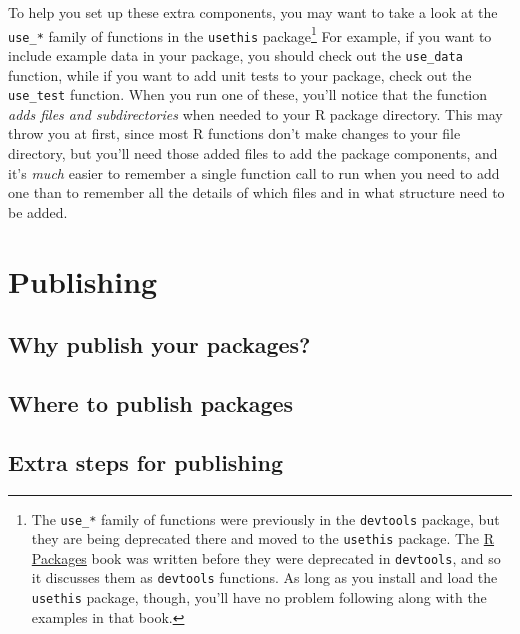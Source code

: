\documentclass[]{tufte-book}
\begin{document}
To help you set up these extra components,
you may want to take a look at the \texttt{use\_*} family of functions in the \texttt{usethis}
\citep{R-usethis}
package\footnote{The \texttt{use\_*} family of functions were previously in the \texttt{devtools} package, but they
  are being deprecated there and moved to the \texttt{usethis}
  package. The \href{http://r-pkgs.had.co.nz/}{R Packages} book was written before they were deprecated
  in \texttt{devtools}, and so it discusses them as \texttt{devtools} functions. As long as you install and load
  the \texttt{usethis} package, though, you'll have no problem following along with the examples in
  that book.} For example, if you want to include example data in your package,
you should check out the \texttt{use\_data} function, while if you want to add unit tests to your
package, check out the \texttt{use\_test} function. When you run one of these, you'll notice that the
function \emph{adds files and subdirectories} when needed to your R package directory. This may
throw you at first, since most R functions don't make changes to your file directory, but
you'll need those added files to add the package components, and it's \emph{much} easier to
remember a single function call to run when you need to add one than to remember all the
details of which files and in what structure need to be added.

\hypertarget{publishing}{%
\section{Publishing}\label{publishing}}

\hypertarget{why-publish-your-packages}{%
\subsection{Why publish your packages?}\label{why-publish-your-packages}}

\hypertarget{where-to-publish-packages}{%
\subsection{Where to publish packages}\label{where-to-publish-packages}}

\hypertarget{extra-steps-for-publishing}{%
\subsection{Extra steps for publishing}\label{extra-steps-for-publishing}}
\end{document}
